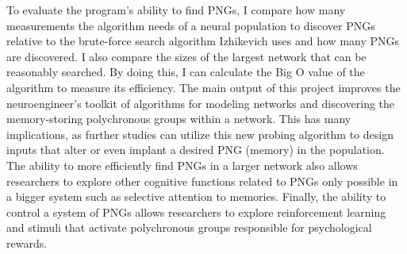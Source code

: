 \documentclass{sigchi}
\begin{document}
To evaluate the program’s ability to find PNGs, I compare how many measurements the algorithm needs of a neural population to discover PNGs relative to the brute-force search algorithm Izhikevich uses and how many PNGs are discovered. I also compare the sizes of the largest network that can be reasonably searched. By doing this, I can calculate the Big O value of the algorithm to measure its efficiency. The main output of this project improves the neuroengineer's toolkit of algorithms for modeling networks and discovering the memory-storing polychronous groups within a network. This has many implications, as further studies can utilize this new probing algorithm to design inputs that alter or even implant a desired PNG (memory) in the population. The ability to more efficiently find PNGs in a larger network also allows researchers to explore other cognitive functions related to PNGs only possible in a bigger system such as selective attention to memories. Finally, the ability to control a system of PNGs allows researchers to explore reinforcement learning and stimuli that activate polychronous groups responsible for psychological rewards.
\end{document}
